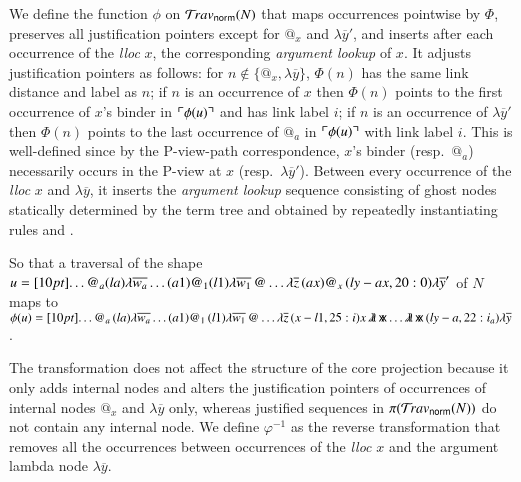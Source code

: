 \documentclass{elsarticle}
\newif\iflongversion
\theoremstyle{plain}
\theoremstyle{definition}
\newcommand{\ghostlmd}{{\lambda\mkern-7mu \lambda}}
\newcommand{\ghostvar}{\mathsf{x\mkern-5mu x}}
\newcommand{\normalizing}{{\sf norm}}
\newcommand{\travsetnorm}{\travset_\normalizing} %
\def\coresymbol{\pi} %
\newcommand\bulklambda[1]{{\lambda\overline{#1}}}
\begin{document}
We define the function $\phi$ on $\travsetnorm(N)$
that maps occurrences pointwise by $\Phi$,
preserves all justification pointers except
for $@_x$ and $\lambda\overline{y}'$,
and inserts after each occurrence of the \emph{lloc} $x$, the corresponding \emph{argument lookup} of $x$.
It adjusts justification pointers as follows:
for $n\not\in \{ @_x, \lambda\overline{y} \}$, $\Phi(n)$ has the same link distance and label as $n$;
if $n$ is an occurrence of $x$ then $\Phi(n)$ points to the first occurrence of $x$'s binder in $\ulcorner \phi(u) \urcorner$ and has link label $i$;
if $n$ is an occurrence of $\lambda\overline{y}'$ then  $\Phi(n)$ points to the last occurrence of $@_a$ in $\ulcorner \phi(u) \urcorner$ with link label $i$.
This is well-defined since by the P-view-path correspondence, $x$'s binder (resp.\ $@_a$) necessarily occurs in the P-view at $x$ (resp.\ $\lambda\overline{y}'$).
%
Between every occurrence of the \emph{lloc} $x$ and $\lambda\overline{y}$,
it inserts the \emph{argument lookup} sequence consisting of ghost
nodes statically determined by the term tree and obtained by repeatedly instantiating rules  and .
%
\iflongversion
Take a traversal $u \in \travset(N)$ involving $@_x$, its image $\phi(u)$ is given by:
\begin{eqnarray*}
    u &=& \Pstr[10pt]{ \ldots (aa){@_a} \cdot (la){\bulklambda{w_a}} \cdot \ldots (a1){@_1} \cdot (l1){\bulklambda{w_1}} \cdot @ \ldots \bulklambda{z} \cdot (ax){@_x} \cdot (ly-ax,20:0){\bulklambda{y}'} }
    \\
    \phi(u) &=& \Pstr[10pt]{ \ldots (aa){@_a} \cdot (la){\bulklambda{w_a}} \cdot \ldots (a1){@_1} \cdot (l1){\bulklambda{w_1}} \cdot @ \ldots \bulklambda{z} \cdot (x-l1,30:i) x \cdot \ghostlmd \cdot \ghostvar \ldots \ghostlmd \cdot \ghostvar \cdot (ly-a,20:i_a){\bulklambda{y}} }
\end{eqnarray*}
\else
So that a traversal of the shape
$u = \Pstr[10pt]{ \ldots @_a (la){\bulklambda{w_a}}
  \ldots (a1){@_1} (l1){\bulklambda{w_1}} \, @ \ldots \bulklambda{z} \, (ax){@_x} \, (ly-ax,20:0){\bulklambda{y}'} }$ of $N$
maps to
$\phi(u) = \Pstr[10pt]{ \ldots @_a \, (la){\bulklambda{w_a}}
\ldots (a1){@_1} \, (l1){\bulklambda{w_1}} \, @ \ldots \bulklambda{z} \, (x-l1,25:i) x \, \ghostlmd \, \ghostvar \ldots \ghostlmd \, \ghostvar \, (ly-a,22:i_a){\bulklambda{y}}}$.
\fi
The transformation does not affect the structure
of the core projection
because it only adds internal nodes and alters the justification pointers of occurrences of internal nodes $@_x$ and $\lambda\overline y$ only,
whereas justified sequences in $\coresymbol(\travsetnorm(N))$ do not contain any internal node.
%
We define $\varphi^{-1}$ as the reverse transformation
that removes all the occurrences between occurrences of the \emph{lloc} $x$ and the  argument lambda node $\lambda\overline{y}$.
\end{document}
